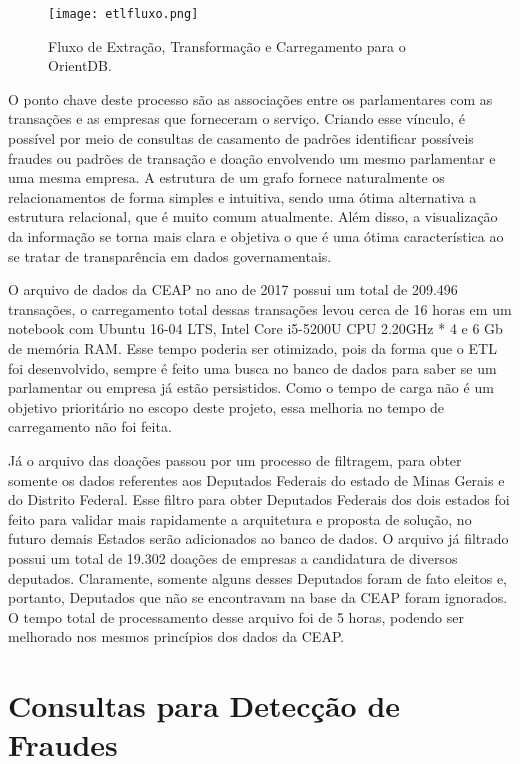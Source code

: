 \begin{figure}[H]
\centering
\texttt{[image: etlfluxo.png]}
\caption{Fluxo de Extração, Transformação e Carregamento para o OrientDB.}
\label{fig:etlfluxo}
\end{figure}

O ponto chave deste processo são as associações entre os parlamentares com as transações e as empresas que forneceram o serviço. Criando esse vínculo, é possível por meio de consultas de casamento de padrões identificar possíveis fraudes ou padrões de transação e doação envolvendo um mesmo parlamentar e uma mesma empresa. A estrutura de um grafo fornece naturalmente os relacionamentos de forma simples e intuitiva, sendo uma ótima alternativa a estrutura relacional, que é muito comum atualmente. Além disso, a visualização da informação se torna mais clara e objetiva o que é uma ótima característica ao se tratar de transparência em dados governamentais.

O arquivo de dados da CEAP no ano de 2017 possui um total de 209.496 transações, o carregamento total dessas transações levou cerca de 16 horas em um notebook com Ubuntu 16-04 LTS, Intel Core i5-5200U CPU 2.20GHz * 4 e 6 Gb de memória RAM. Esse tempo poderia ser otimizado, pois da forma que o ETL foi desenvolvido, sempre é feito uma busca no banco de dados para saber se um parlamentar ou empresa já estão persistidos. Como o tempo de carga não é um objetivo prioritário no escopo deste projeto, essa melhoria no tempo de carregamento não foi feita.

Já o arquivo das doações passou por um processo de filtragem, para obter somente os dados referentes aos Deputados Federais do estado de Minas Gerais e do Distrito Federal. Esse filtro para obter Deputados Federais dos dois estados foi feito para validar mais rapidamente a arquitetura e proposta de solução, no futuro demais Estados serão adicionados ao banco de dados. O arquivo já filtrado possui um total de 19.302 doações de empresas a candidatura de diversos deputados. Claramente, somente alguns desses Deputados foram de fato eleitos e, portanto, Deputados que não se encontravam na base da CEAP foram ignorados. O tempo total de processamento desse arquivo foi de 5 horas, podendo ser melhorado nos mesmos princípios dos dados da CEAP.

\section{Consultas para Detecção de Fraudes}

